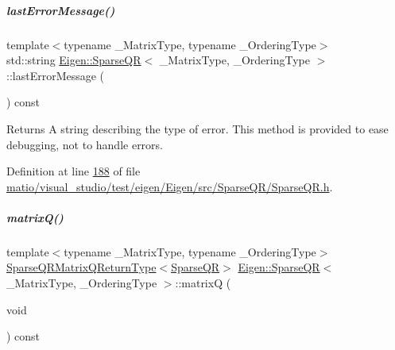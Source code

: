 \mbox{\label{group___sparse_q_r___module_a1222e59649d77125d91f1368cf293c63}} 
\subparagraph{\texorpdfstring{last\+Error\+Message()}{lastErrorMessage()}\hspace{0.1cm}{\footnotesize\ttfamily [2/2]}}
{\footnotesize\ttfamily template$<$typename \+\_\+\+Matrix\+Type, typename \+\_\+\+Ordering\+Type$>$ \\
std\+::string \hyperlink{group___sparse_q_r___module_class_eigen_1_1_sparse_q_r}{Eigen\+::\+Sparse\+QR}$<$ \+\_\+\+Matrix\+Type, \+\_\+\+Ordering\+Type $>$\+::last\+Error\+Message (\begin{DoxyParamCaption}{ }\end{DoxyParamCaption}) const\hspace{0.3cm}{\ttfamily [inline]}}

\begin{DoxyReturn}{Returns}
A string describing the type of error. This method is provided to ease debugging, not to handle errors. 
\end{DoxyReturn}


Definition at line \hyperlink{matio_2visual__studio_2test_2eigen_2_eigen_2src_2_sparse_q_r_2_sparse_q_r_8h_source_l00188}{188} of file \hyperlink{matio_2visual__studio_2test_2eigen_2_eigen_2src_2_sparse_q_r_2_sparse_q_r_8h_source}{matio/visual\+\_\+studio/test/eigen/\+Eigen/src/\+Sparse\+Q\+R/\+Sparse\+Q\+R.\+h}.

\mbox{\label{group___sparse_q_r___module_ae1cc0a836c177d4f42600f8639354be1}} 
\subparagraph{\texorpdfstring{matrix\+Q()}{matrixQ()}\hspace{0.1cm}{\footnotesize\ttfamily [1/2]}}
{\footnotesize\ttfamily template$<$typename \+\_\+\+Matrix\+Type, typename \+\_\+\+Ordering\+Type$>$ \\
\hyperlink{struct_eigen_1_1_sparse_q_r_matrix_q_return_type}{Sparse\+Q\+R\+Matrix\+Q\+Return\+Type}$<$\hyperlink{group___sparse_q_r___module_class_eigen_1_1_sparse_q_r}{Sparse\+QR}$>$ \hyperlink{group___sparse_q_r___module_class_eigen_1_1_sparse_q_r}{Eigen\+::\+Sparse\+QR}$<$ \+\_\+\+Matrix\+Type, \+\_\+\+Ordering\+Type $>$\+::matrixQ (\begin{DoxyParamCaption}\item[{void}]{ }\end{DoxyParamCaption}) const\hspace{0.3cm}{\ttfamily [inline]}}


